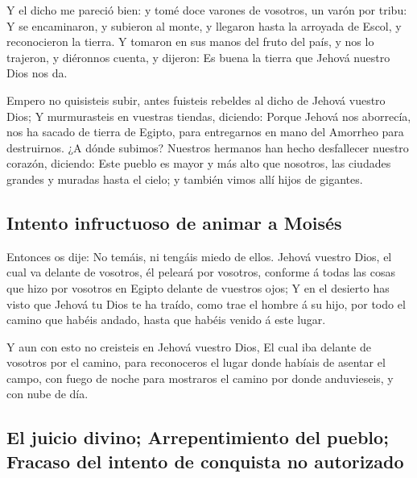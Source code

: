  Y el dicho me pareció bien: y tomé doce varones de
vosotros, un varón por tribu:  Y se encaminaron, y
subieron al monte, y llegaron hasta la arroyada de Escol, y reconocieron
la tierra.  Y tomaron en sus manos del fruto del país, y
nos lo trajeron, y diéronnos cuenta, y dijeron: Es buena la tierra que
Jehová nuestro Dios nos da.

 Empero no quisisteis subir, antes fuisteis rebeldes al
dicho de Jehová vuestro Dios;  Y murmurasteis en vuestras
tiendas, diciendo: Porque Jehová nos aborrecía, nos ha sacado de tierra
de Egipto, para entregarnos en mano del Amorrheo para destruirnos.
 ¿A dónde subimos? Nuestros hermanos han hecho
desfallecer nuestro corazón, diciendo: Este pueblo es mayor y más alto
que nosotros, las ciudades grandes y muradas hasta el cielo; y también
vimos allí hijos de gigantes.

\hypertarget{intento-infructuoso-de-animar-a-moisuxe9s}{%
\subsection{Intento infructuoso de animar a
Moisés}\label{intento-infructuoso-de-animar-a-moisuxe9s}}

 Entonces os dije: No temáis, ni tengáis miedo de ellos.
 Jehová vuestro Dios, el cual va delante de vosotros, él
peleará por vosotros, conforme á todas las cosas que hizo por vosotros
en Egipto delante de vuestros ojos;  Y en el desierto has
visto que Jehová tu Dios te ha traído, como trae el hombre á su hijo,
por todo el camino que habéis andado, hasta que habéis venido á este
lugar.

 Y aun con esto no creisteis en Jehová vuestro Dios,
 El cual iba delante de vosotros por el camino, para
reconoceros el lugar donde habíais de asentar el campo, con fuego de
noche para mostraros el camino por donde anduvieseis, y con nube de día.

\hypertarget{el-juicio-divino-arrepentimiento-del-pueblo-fracaso-del-intento-de-conquista-no-autorizado}{%
\subsection{El juicio divino; Arrepentimiento del pueblo; Fracaso del
intento de conquista no
autorizado}\label{el-juicio-divino-arrepentimiento-del-pueblo-fracaso-del-intento-de-conquista-no-autorizado}}

